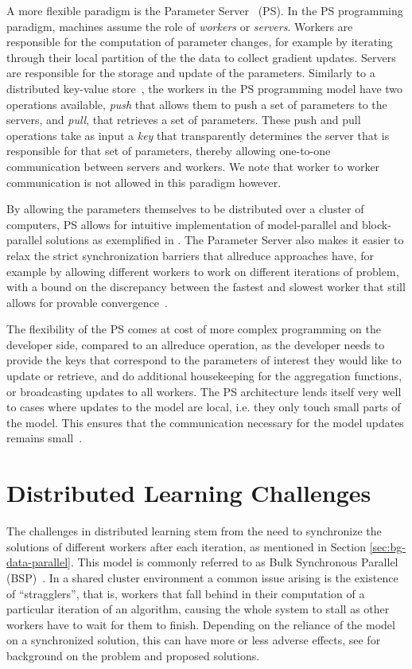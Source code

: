 A more flexible paradigm is the Parameter Server~\cite{muPS} (PS). In the PS programming
paradigm, machines assume the role of \emph{workers} or \emph{servers}. Workers are
responsible for the computation of parameter changes, for example by iterating through
their local partition of the the data to collect gradient updates. Servers are responsible
for the storage and update of the parameters.
Similarly to a distributed key-value store~\cite{dynamo}, the workers in the PS programming
model have two operations available, \emph{push} that allows them to push a set of
parameters to the servers, and \emph{pull}, that retrieves a set of parameters.
These push and pull operations take as input a \emph{key} that transparently determines
the server that is responsible for that set of parameters, thereby allowing
one-to-one communication between servers and workers. We note that worker to
worker communication is not allowed in this paradigm however.

By allowing the parameters themselves to be
distributed over a cluster of computers, PS allows for intuitive implementation of
model-parallel and block-parallel solutions as exemplified in \cite{muPS, lightLDA}.
The Parameter Server also makes it easier to relax the strict synchronization
barriers that allreduce approaches have, for example by allowing different workers
to work on different iterations of problem, with a bound on the discrepancy between
the fastest and slowest worker that still allows for provable convergence~\cite{stale-sync-ps}.

The flexibility of the PS comes at cost of more complex programming on the developer
side, compared to an allreduce operation, as the developer needs to provide the
keys that correspond to the parameters of interest they would like to update or
retrieve, and do additional housekeeping for the aggregation functions, or broadcasting
updates to all workers. The PS architecture lends itself very well to cases where updates to the model
are local, i.e. they only touch small parts of the model. This ensures that the communication
necessary for the model updates remains small~\cite{muPS}.

\section{Distributed Learning Challenges}
\label{sec:bg-ml-challenges}

The challenges in distributed learning stem from the need to synchronize the solutions of different workers
after each iteration,
as mentioned in Section \ref{sec:bg-data-parallel}. This model is commonly referred to as
Bulk Synchronous Parallel (BSP)~\cite{stale-sync-ps}.
In a shared cluster environment a common issue arising is the existence of ``stragglers'', that is,
workers that fall behind in their computation of a particular iteration of an algorithm, causing
the whole system to stall as other workers have to wait for them to finish. Depending on the reliance
of the model on a synchronized solution, this can have more or less adverse effects, see
\cite{straggler-ml} for background on the problem and proposed solutions.

